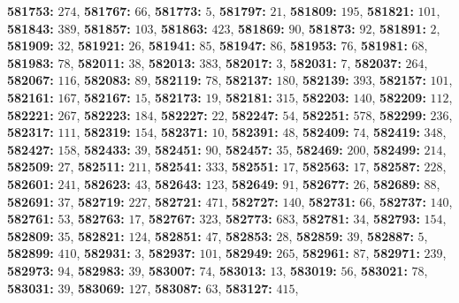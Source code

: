 \textsf{\bfseries 581753:} $274$, \textsf{\bfseries 581767:} $66$, \textsf{\bfseries 581773:} $5$, \textsf{\bfseries 581797:} $21$, \textsf{\bfseries 581809:} $195$, \textsf{\bfseries 581821:} $101$, \textsf{\bfseries 581843:} $389$, \textsf{\bfseries 581857:} $103$, \textsf{\bfseries 581863:} $423$, \textsf{\bfseries 581869:} $90$, \textsf{\bfseries 581873:} $92$, \textsf{\bfseries 581891:} $2$, \textsf{\bfseries 581909:} $32$, \textsf{\bfseries 581921:} $26$, \textsf{\bfseries 581941:} $85$, \textsf{\bfseries 581947:} $86$, \textsf{\bfseries 581953:} $76$, \textsf{\bfseries 581981:} $68$, \textsf{\bfseries 581983:} $78$, \textsf{\bfseries 582011:} $38$, \textsf{\bfseries 582013:} $383$, \textsf{\bfseries 582017:} $3$, \textsf{\bfseries 582031:} $7$, \textsf{\bfseries 582037:} $264$, \textsf{\bfseries 582067:} $116$, \textsf{\bfseries 582083:} $89$, \textsf{\bfseries 582119:} $78$, \textsf{\bfseries 582137:} $180$, \textsf{\bfseries 582139:} $393$, \textsf{\bfseries 582157:} $101$, \textsf{\bfseries 582161:} $167$, \textsf{\bfseries 582167:} $15$, \textsf{\bfseries 582173:} $19$, \textsf{\bfseries 582181:} $315$, \textsf{\bfseries 582203:} $140$, \textsf{\bfseries 582209:} $112$, \textsf{\bfseries 582221:} $267$, \textsf{\bfseries 582223:} $184$, \textsf{\bfseries 582227:} $22$, \textsf{\bfseries 582247:} $54$, \textsf{\bfseries 582251:} $578$, \textsf{\bfseries 582299:} $236$, \textsf{\bfseries 582317:} $111$, \textsf{\bfseries 582319:} $154$, \textsf{\bfseries 582371:} $10$, \textsf{\bfseries 582391:} $48$, \textsf{\bfseries 582409:} $74$, \textsf{\bfseries 582419:} $348$, \textsf{\bfseries 582427:} $158$, \textsf{\bfseries 582433:} $39$, \textsf{\bfseries 582451:} $90$, \textsf{\bfseries 582457:} $35$, \textsf{\bfseries 582469:} $200$, \textsf{\bfseries 582499:} $214$, \textsf{\bfseries 582509:} $27$, \textsf{\bfseries 582511:} $211$, \textsf{\bfseries 582541:} $333$, \textsf{\bfseries 582551:} $17$, \textsf{\bfseries 582563:} $17$, \textsf{\bfseries 582587:} $228$, \textsf{\bfseries 582601:} $241$, \textsf{\bfseries 582623:} $43$, \textsf{\bfseries 582643:} $123$, \textsf{\bfseries 582649:} $91$, \textsf{\bfseries 582677:} $26$, \textsf{\bfseries 582689:} $88$, \textsf{\bfseries 582691:} $37$, \textsf{\bfseries 582719:} $227$, \textsf{\bfseries 582721:} $471$, \textsf{\bfseries 582727:} $140$, \textsf{\bfseries 582731:} $66$, \textsf{\bfseries 582737:} $140$, \textsf{\bfseries 582761:} $53$, \textsf{\bfseries 582763:} $17$, \textsf{\bfseries 582767:} $323$, \textsf{\bfseries 582773:} $683$, \textsf{\bfseries 582781:} $34$, \textsf{\bfseries 582793:} $154$, \textsf{\bfseries 582809:} $35$, \textsf{\bfseries 582821:} $124$, \textsf{\bfseries 582851:} $47$, \textsf{\bfseries 582853:} $28$, \textsf{\bfseries 582859:} $39$, \textsf{\bfseries 582887:} $5$, \textsf{\bfseries 582899:} $410$, \textsf{\bfseries 582931:} $3$, \textsf{\bfseries 582937:} $101$, \textsf{\bfseries 582949:} $265$, \textsf{\bfseries 582961:} $87$, \textsf{\bfseries 582971:} $239$, \textsf{\bfseries 582973:} $94$, \textsf{\bfseries 582983:} $39$, \textsf{\bfseries 583007:} $74$, \textsf{\bfseries 583013:} $13$, \textsf{\bfseries 583019:} $56$, \textsf{\bfseries 583021:} $78$, \textsf{\bfseries 583031:} $39$, \textsf{\bfseries 583069:} $127$, \textsf{\bfseries 583087:} $63$, \textsf{\bfseries 583127:} $415$, 
